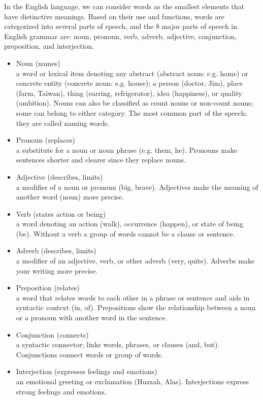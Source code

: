 In the English language, we can consider words as the smallest elements that have distinctive meanings. Based on their use and functions, words are categorized into several parts of speech, and the 8 major parts of speech in English grammar are: noun, pronoun, verb, adverb, adjective, conjunction, preposition, and interjection.
\begin{itemize}
	\item Noun (names)\\
	a word or lexical item denoting any abstract (abstract noun: e.g. home) or concrete entity (concrete noun: e.g. house); a person (doctor, Jim), place (farm, Taiwan), thing (earring, refrigerator), idea (happiness), or quality (ambition). Nouns can also be classified as count nouns or non-count nouns; some can belong to either category. The most common part of the speech; they are called naming words.
	
	\item Pronoun (replaces)\\
	a substitute for a noun or noun phrase (e.g. them, he). Pronouns make sentences shorter and clearer since they replace nouns.
	
	\item Adjective (describes, limits)\\
	a modifier of a noun or pronoun (big, brave). Adjectives make the meaning of another word (noun) more precise.
	
	\item Verb (states action or being)\\
	a word denoting an action (walk), occurrence (happen), or state of being (be). Without a verb a group of words cannot be a clause or sentence.
	\item Adverb (describes, limits)\\
	a modifier of an adjective, verb, or other adverb (very, quite). Adverbs make your writing more precise.
	
	\item Preposition (relates)\\
	a word that relates words to each other in a phrase or sentence and aids in syntactic context (in, of). Prepositions show the relationship between a noun or a pronoun with another word in the sentence.
	
	\item Conjunction (connects)\\
	a syntactic connector; links words, phrases, or clauses (and, but). Conjunctions connect words or group of words.
	
	\item Interjection (expresses feelings and emotions)\\
	an emotional greeting or exclamation (Huzzah, Alas). Interjections express strong feelings and emotions.
\end{itemize}

